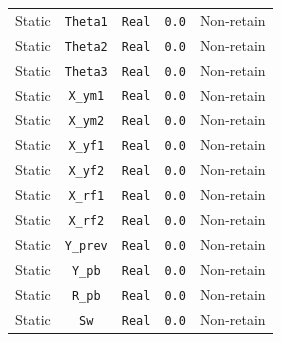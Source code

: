 \begin{center}
\begin{longtable}{c c c c c}
    Static & \texttt{Theta1} & \texttt{Real} & \texttt{0.0} & Non-retain \\ %
    Static & \texttt{Theta2} & \texttt{Real} & \texttt{0.0} & Non-retain \\ %
    Static & \texttt{Theta3} & \texttt{Real} & \texttt{0.0} & Non-retain \\ %
    Static & \texttt{X\_ym1} & \texttt{Real} & \texttt{0.0} & Non-retain \\ %
    Static & \texttt{X\_ym2} & \texttt{Real} & \texttt{0.0} & Non-retain \\ %
    Static & \texttt{X\_yf1} & \texttt{Real} & \texttt{0.0} & Non-retain \\ %
    Static & \texttt{X\_yf2} & \texttt{Real} & \texttt{0.0} & Non-retain \\ %
    Static & \texttt{X\_rf1} & \texttt{Real} & \texttt{0.0} & Non-retain \\ %
    Static & \texttt{X\_rf2} & \texttt{Real} & \texttt{0.0} & Non-retain \\ %
    Static & \texttt{Y\_prev} & \texttt{Real} & \texttt{0.0} & Non-retain \\ %
    Static & \texttt{Y\_pb} & \texttt{Real} & \texttt{0.0} & Non-retain \\ %
    Static & \texttt{R\_pb} & \texttt{Real} & \texttt{0.0} & Non-retain \\ %
    Static & \texttt{Sw} & \texttt{Real} & \texttt{0.0} & Non-retain \\ %


\end{longtable}
\end{center}
